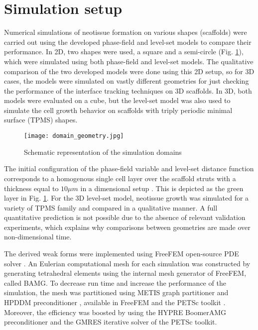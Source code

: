 \section{Simulation setup}

Numerical simulations of neotissue formation on various shapes (scaffolds) were carried out using the developed phase-field and level-set models to compare their performance. In 2D, two shapes were used, a square and a semi-circle (Fig. \ref{fig:tissue_domain_geometry}), which were simulated using both phase-field and level-set models. The qualitative comparison of the two developed models were done using this 2D setup, so for 3D cases, the models were simulated on vastly different geometries for just checking the performance of the interface tracking techniques on 3D scaffolds. In 3D, both models were evaluated on a cube, but the level-set model was also used to simulate the cell growth behavior on scaffolds with triply periodic minimal surface ({TPMS}) shapes.

\begin{figure}
\centering
\medskip
\texttt{[image: domain\_geometry.jpg]}
\caption[Schematic representation of the simulation domains]{Schematic representation of the simulation domains}
\label{fig:tissue_domain_geometry}
\end{figure}

The initial configuration of the phase-field variable and level-set distance function corresponds to a homogenous single cell layer over the scaffold struts with a thickness equal to $10 \mu m$ in a dimensional setup \cite{Darling2008}. This is depicted as the green layer in Fig. \ref{fig:tissue_domain_geometry}. For the 3D level-set model, neotissue growth was simulated for a variety of {TPMS} family and compared in a qualitative manner. A full quantitative prediction is not possible due to the absence of relevant validation experiments, which explains why comparisons between geometries are made over non-dimensional time.

The derived weak forms were implemented using FreeFEM open-source {PDE} solver \cite{Hecht2012}. An Eulerian computational mesh for each simulation was constructed by generating tetrahedral elements using the internal mesh generator of FreeFEM, called BAMG. To decrease run time and increase the performance of the simulation, the mesh was partitioned using  METIS graph partitioner \cite{METIS1998} and {HPDDM} preconditioner \cite{Jolivet2013}, available in FreeFEM and the {PETSc} toolkit \cite{petsc}. Moreover, the efficiency was boosted by using the HYPRE BoomerAMG preconditioner \cite{Falgout2002} and the {GMRES} iterative solver \cite{Saad1986} of the {PETSc} toolkit.


